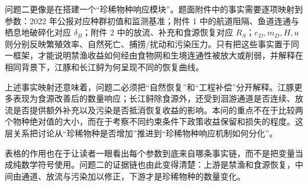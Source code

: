 问题二更像是在搭建一个“珍稀物种响应模块”。题面附件中的事实需要逐项映射到参数：2022 年公报对应种群初值和监测基准；附件 1 中的航道阻隔、鱼道连通与栖息地破碎化对应 \(\delta_B\)；附件 2 中的放流、补充和食源恢复对应 \(R_S\)；\(e_D,m_D,H,u\) 则分别反映繁殖效率、自然死亡、捕捞/扰动和污染压力。只有把这些事实置于同一框架，才能说明禁渔收益如何经由食物网和生境连通性被放大或削弱，并解释在相同背景下，江豚和长江鲟为何呈现不同的恢复曲线\cite{report2022}。

上述事实映射还意味着，问题二必须把“自然恢复”和“工程补偿”分开解释。江豚更多表现为食源改善后的数量响应；长江鲟除食源外，还受到洄游通道是否连续、放流是否提供额外补充以及污染是否抵消恢复收益的影响。本问的重点不在于比较两个物种绝对值的大小，而在于考察不同约束条件下政策收益保留和损失的程度。这层关系把讨论从“珍稀物种是否增加”推进到“珍稀物种响应机制如何分化”。

表格的作用也在于让读者一眼看出每个参数到底来自哪条事实链，而不是把变量当成纯数学符号使用。问题二的证据链也由此变得清楚：上游是禁渔和食源恢复，中间由通道、放流与污染加以修正，下游才是珍稀物种的数量变化。
